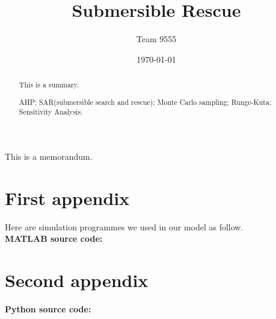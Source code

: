 \documentclass{mcmthsis}  %
\title{Submersible Rescue}  %
\author{\small Team 9555}  %
\date{\today}  %
\begin{document}
\begin{abstract}  %
This is a summary.
\begin{keywords}  %
AHP; SAR(submersible search and rescue); Monte Carlo sampling; Runge-Kuta; Sensitivity Analysis.
\end{keywords}  %
\end{abstract}  %
\maketitle  %
\tableofcontents  %



\newpage  %









\newpage
\printbibliography  %


\newpage
\begin{appendices}  %

\begin{memo}[Memorandum]  %
	This is a memorandum.
\end{memo}  %

\section{First appendix}  %

Here are simulation programmes we used in our model as follow.\\
\textbf{MATLAB source code:}


\section{Second appendix}  %

\textbf{Python source code:}


\end{appendices}  %
\end{document}
